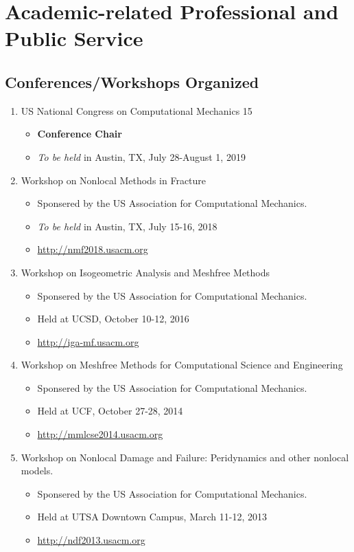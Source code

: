 \section*{Academic-related Professional and Public Service}

\subsection*{Conferences/Workshops Organized}
  \begin{enumerate}
      \item US National Congress on Computational Mechanics 15
          \begin{itemize}
             \item {\bf Conference Chair}
             \item \emph{To be held} in Austin, TX, July 28-August 1, 2019
          \end{itemize}
      \item Workshop on Nonlocal Methods in Fracture
          \begin{itemize}
             \item Sponsered by the US Association for Computational Mechanics.
             \item \emph{To be held} in Austin, TX, July 15-16, 2018
             \item \url{http://nmf2018.usacm.org}
          \end{itemize}
      \item Workshop on Isogeometric Analysis and Meshfree Methods
          \begin{itemize}
             \item Sponsered by the US Association for Computational Mechanics.
             \item Held at UCSD, October 10-12, 2016
             \item \url{http://iga-mf.usacm.org}
          \end{itemize}
      \item Workshop on Meshfree Methods for Computational Science and Engineering
          \begin{itemize}
             \item Sponsered by the US Association for Computational Mechanics.
             \item Held at UCF, October 27-28, 2014
             \item \url{http://mmlcse2014.usacm.org}
          \end{itemize}
      \item Workshop on Nonlocal Damage and Failure: Peridynamics and other nonlocal models.  
          \begin{itemize}
             \item Sponsered by the US Association for Computational Mechanics.
             \item Held at UTSA Downtown Campus, March 11-12, 2013
             \item \url{http://ndf2013.usacm.org}
          \end{itemize}
  \end{enumerate}

